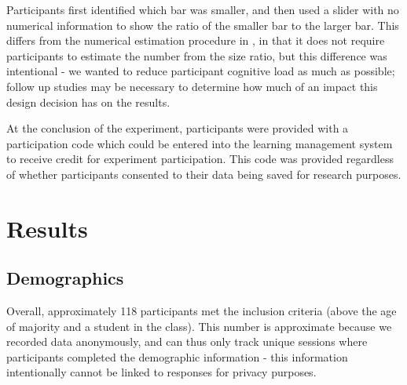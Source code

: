 \documentclass[runningheads
]{llncs}
\begin{document}
Participants first identified which bar was smaller, and then used a
slider with no numerical information to show the ratio of the smaller
bar to the larger bar. This differs from the numerical estimation
procedure in \textcite{clevelandGraphicalPerceptionTheory1984}, in that
it does not require participants to estimate the number from the size
ratio, but this difference was intentional - we wanted to reduce
participant cognitive load as much as possible; follow up studies may be
necessary to determine how much of an impact this design decision has on
the results.

At the conclusion of the experiment, participants were provided with a
participation code which could be entered into the learning management
system to receive credit for experiment participation. This code was
provided regardless of whether participants consented to their data
being saved for research purposes.

\section{Results}\label{results}

\subsection{Demographics}\label{demographics}

Overall, approximately 118 participants met the inclusion criteria
(above the age of majority and a student in the class). This number is
approximate because we recorded data anonymously, and can thus only
track unique sessions where participants completed the demographic
information - this information intentionally cannot be linked to
responses for privacy purposes.
\end{document}
